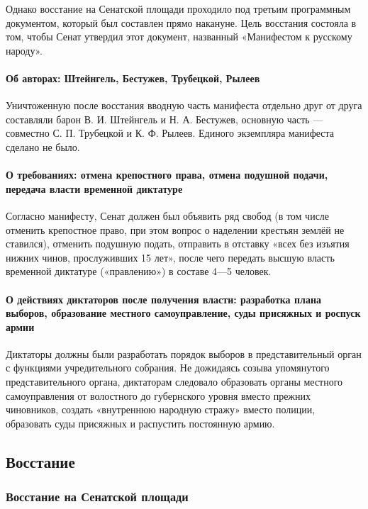 \documentclass{article}
\begin{document}
Однако восстание на Сенатской площади проходило под третьим программным документом, который был составлен прямо накануне. Цель восстания состояла в том, чтобы Сенат утвердил этот документ, названный «Манифестом к русскому народу».

\paragraph{Об авторах: Штейнгель, Бестужев, Трубецкой, Рылеев}

Уничтоженную после восстания вводную часть манифеста отдельно друг от друга составляли барон В. И. Штейнгель и Н. А. Бестужев, основную часть — совместно С. П. Трубецкой и К. Ф. Рылеев. Единого экземпляра манифеста сделано не было.

\paragraph{О требованиях: отмена крепостного права, отмена подушной подачи, передача власти временной диктатуре}

Согласно манифесту, Сенат должен был объявить ряд свобод (в том числе отменить крепостное право, при этом вопрос о наделении крестьян землёй не ставился), отменить подушную подать, отправить в отставку «всех без изъятия нижних чинов, прослуживших 15 лет», после чего передать высшую власть временной диктатуре («правлению») в составе 4—5 человек.

\paragraph{О действиях диктаторов после получения власти: разработка плана выборов, образование местного самоуправление, суды присяжных и роспуск армии}

Диктаторы должны были разработать порядок выборов в представительный орган с функциями учредительного собрания. Не дожидаясь созыва упомянутого представительного органа, диктаторам следовало образовать органы местного самоуправления от волостного до губернского уровня вместо прежних чиновников, создать «внутреннюю народную стражу» вместо полиции, образовать суды присяжных и распустить постоянную армию.

\subsection{Восстание}

\subsubsection{Восстание на Сенатской площади}
\end{document}
